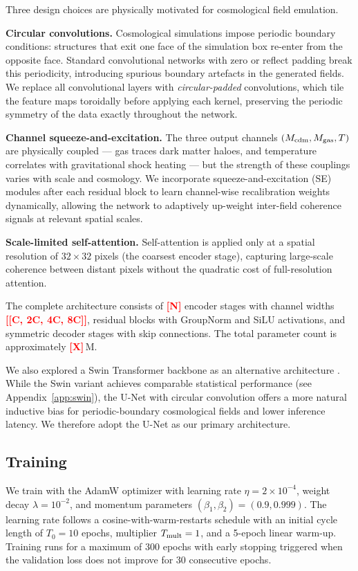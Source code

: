 \documentclass[usenatbib]{mnras}
\newcommand{\FILL}[1]{\textcolor{red}{\textbf{[#1]}}}
\newcommand{\Mcdm}{M_{\rm cdm}}
\newcommand{\Mgas}{M_{\rm gas}}
\newcommand{\Tgas}{T}
\begin{document}
Three design choices are physically motivated for cosmological field
emulation.

\textbf{Circular convolutions.}
Cosmological simulations impose periodic boundary conditions: structures
that exit one face of the simulation box re-enter from the opposite
face.
Standard convolutional networks with zero or reflect padding break this
periodicity, introducing spurious boundary artefacts in the generated
fields.
We replace all convolutional layers with \emph{circular-padded}
convolutions, which tile the feature maps toroidally before applying
each kernel, preserving the periodic symmetry of the data exactly
throughout the network.

\textbf{Channel squeeze-and-excitation.}
The three output channels $(\Mcdm, \Mgas, \Tgas)$ are physically
coupled --- gas traces dark matter haloes, and temperature correlates
with gravitational shock heating --- but the strength of these couplings
varies with scale and cosmology.
We incorporate squeeze-and-excitation (SE) modules \citep{Hu2018} after
each residual block to learn channel-wise recalibration weights
dynamically, allowing the network to adaptively up-weight inter-field
coherence signals at relevant spatial scales.

\textbf{Scale-limited self-attention.}
Self-attention is applied only at a spatial resolution of
$32 \times 32$ pixels (the coarsest encoder stage), capturing
large-scale coherence between distant pixels without the quadratic cost
of full-resolution attention.

The complete architecture consists of \FILL{N} encoder stages with
channel widths \FILL{[C, 2C, 4C, 8C]}, residual blocks with GroupNorm
and SiLU activations, and symmetric decoder stages with skip
connections.
The total parameter count is approximately \FILL{X}\,M.

We also explored a Swin Transformer backbone as an alternative
architecture \citep{Liu2021}.
While the Swin variant achieves comparable statistical performance (see
Appendix~\ref{app:swin}), the U-Net with circular convolution offers a
more natural inductive bias for periodic-boundary cosmological fields
and lower inference latency.
We therefore adopt the U-Net as our primary architecture.

\subsection{Training}
\label{sec:training}

We train with the AdamW optimizer \citep{Loshchilov2019} with learning
rate $\eta = 2 \times 10^{-4}$, weight decay $\lambda = 10^{-2}$, and
momentum parameters $(\beta_1, \beta_2) = (0.9, 0.999)$.
The learning rate follows a cosine-with-warm-restarts schedule
\citep{Loshchilov2017} with an initial cycle length of $T_0 = 10$
epochs, multiplier $T_{\rm mult} = 1$, and a 5-epoch linear warm-up.
Training runs for a maximum of 300 epochs with early stopping triggered
when the validation loss does not improve for 30 consecutive epochs.
\end{document}
